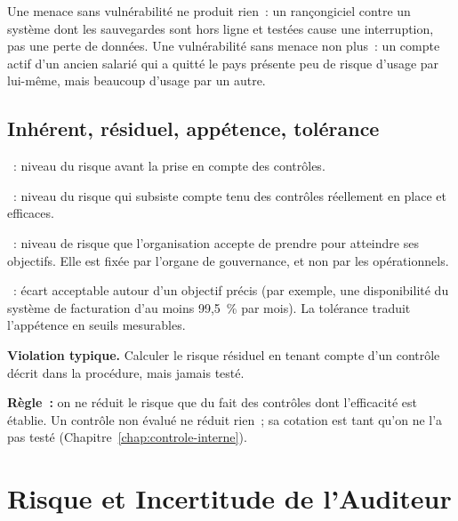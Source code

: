 Une menace sans vulnérabilité ne produit rien~: un rançongiciel contre un
système dont les sauvegardes sont hors ligne et testées cause une
interruption, pas une perte de données. Une vulnérabilité sans menace non
plus~: un compte actif d'un ancien salarié qui a quitté le pays présente
peu de risque d'usage par lui-même, mais beaucoup d'usage par un autre.

\subsection{Inhérent, résiduel, appétence, tolérance}

\begin{boxdef}
~: niveau du risque avant
la prise en compte des contrôles.

\medskip
{}~: niveau du risque qui
subsiste compte tenu des contrôles réellement en place et efficaces.

\medskip
{}~: niveau de risque
que l'organisation accepte de prendre pour atteindre ses objectifs. Elle est
fixée par l'organe de gouvernance, et non par les opérationnels.

\medskip
{}~: écart acceptable autour
d'un objectif précis (par exemple, une disponibilité du système de
facturation d'au moins 99,5~\% par mois). La tolérance traduit
l'appétence en seuils mesurables.
\end{boxdef}

\begin{boxalert}
\textbf{Violation typique.} Calculer le risque résiduel en tenant compte
d'un contrôle décrit dans la procédure, mais jamais testé.

\smallskip
\textbf{Règle~:} on ne réduit le risque que du fait des contrôles dont
l'efficacité est établie. Un contrôle non évalué ne réduit rien~; sa cotation
est \NEK{} tant qu'on ne l'a pas testé (Chapitre~\ref{chap:controle-interne}).
\end{boxalert}

\section{Risque et Incertitude de l'Auditeur}
\label{sec:c04-incertitude}


